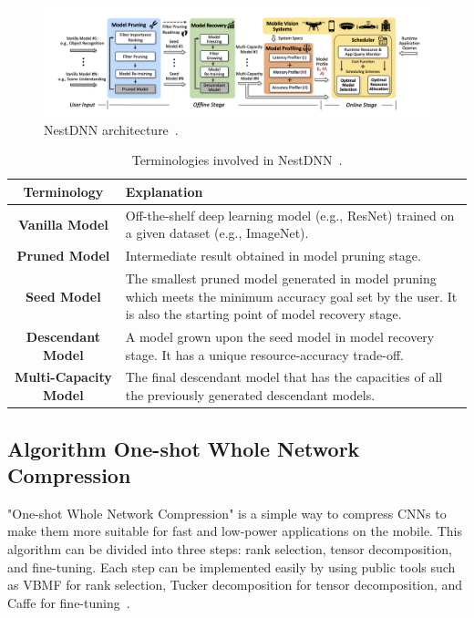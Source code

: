 \documentclass{article}
\begin{document}
	\begin{figure}[htbp]
	\centering
	\includegraphics[width=1\linewidth]{figure/nestdnn_architecture.png}
	\caption{NestDNN architecture~\cite{fang2018nestdnn}.}
	\label{nestdnn_arch}
\end{figure}

\begin{table}
	\label{table_nestdnn}
	\centering
	\begin{tabular}{|c|>{\centering\arraybackslash}p{8cm}|}
		\hline
		\textbf{Terminology}&\textbf{Explanation}\\
		\hline
		\textbf{Vanilla Model}&Off-the-shelf deep learning model (e.g., ResNet) trained on a given dataset (e.g., ImageNet). \\
		\hline
		\textbf{Pruned Model}&Intermediate result obtained in model pruning stage.\\
		\hline
		\textbf{Seed Model}&The smallest pruned model generated in model pruning which meets the minimum accuracy goal set by the user. It is also the starting point of model recovery stage.\\
		\hline
		\textbf{Descendant Model}&A model grown upon the seed model in model recovery stage. It has a unique resource-accuracy trade-off.\\
		\hline
		\textbf{Multi-Capacity Model}&The final descendant model that has the capacities of
		all the previously generated descendant models.\\
		\hline
	\end{tabular}
	\caption{Terminologies involved in NestDNN~\cite{fang2018nestdnn}.}
\end{table}


\subsection{Algorithm One-shot Whole Network Compression}\label{oneshot}
"One-shot Whole Network Compression" is a simple way to compress CNNs to make them more suitable for fast and low-power applications on the mobile. This algorithm can be divided into three steps: rank selection, tensor decomposition, and fine-tuning. Each step can be implemented easily by using public tools such as VBMF for rank selection, Tucker decomposition for tensor decomposition, and Caffe for fine-tuning~\cite{kim2016compression}.
\end{document}
